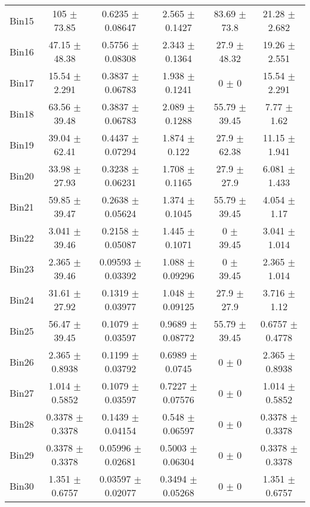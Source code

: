 \begin{tabular}{@{\extracolsep{4pt}}lccccc@{}}
     Bin15 & 105 $\pm$ 73.85 & 0.6235 $\pm$ 0.08647 & 2.565 $\pm$ 0.1427 & 83.69 $\pm$ 73.8 & 21.28 $\pm$ 2.682 \\ 
     Bin16 & 47.15 $\pm$ 48.38 & 0.5756 $\pm$ 0.08308 & 2.343 $\pm$ 0.1364 & 27.9 $\pm$ 48.32 & 19.26 $\pm$ 2.551 \\ 
     Bin17 & 15.54 $\pm$ 2.291 & 0.3837 $\pm$ 0.06783 & 1.938 $\pm$ 0.1241 & 0 $\pm$ 0 & 15.54 $\pm$ 2.291 \\ 
     Bin18 & 63.56 $\pm$ 39.48 & 0.3837 $\pm$ 0.06783 & 2.089 $\pm$ 0.1288 & 55.79 $\pm$ 39.45 & 7.77 $\pm$ 1.62 \\ 
     Bin19 & 39.04 $\pm$ 62.41 & 0.4437 $\pm$ 0.07294 & 1.874 $\pm$ 0.122 & 27.9 $\pm$ 62.38 & 11.15 $\pm$ 1.941 \\ 
     Bin20 & 33.98 $\pm$ 27.93 & 0.3238 $\pm$ 0.06231 & 1.708 $\pm$ 0.1165 & 27.9 $\pm$ 27.9 & 6.081 $\pm$ 1.433 \\ 
     Bin21 & 59.85 $\pm$ 39.47 & 0.2638 $\pm$ 0.05624 & 1.374 $\pm$ 0.1045 & 55.79 $\pm$ 39.45 & 4.054 $\pm$ 1.17 \\ 
     Bin22 & 3.041 $\pm$ 39.46 & 0.2158 $\pm$ 0.05087 & 1.445 $\pm$ 0.1071 & 0 $\pm$ 39.45 & 3.041 $\pm$ 1.014 \\ 
     Bin23 & 2.365 $\pm$ 39.46 & 0.09593 $\pm$ 0.03392 & 1.088 $\pm$ 0.09296 & 0 $\pm$ 39.45 & 2.365 $\pm$ 1.014 \\ 
     Bin24 & 31.61 $\pm$ 27.92 & 0.1319 $\pm$ 0.03977 & 1.048 $\pm$ 0.09125 & 27.9 $\pm$ 27.9 & 3.716 $\pm$ 1.12 \\ 
     Bin25 & 56.47 $\pm$ 39.45 & 0.1079 $\pm$ 0.03597 & 0.9689 $\pm$ 0.08772 & 55.79 $\pm$ 39.45 & 0.6757 $\pm$ 0.4778 \\ 
     Bin26 & 2.365 $\pm$ 0.8938 & 0.1199 $\pm$ 0.03792 & 0.6989 $\pm$ 0.0745 & 0 $\pm$ 0 & 2.365 $\pm$ 0.8938 \\ 
     Bin27 & 1.014 $\pm$ 0.5852 & 0.1079 $\pm$ 0.03597 & 0.7227 $\pm$ 0.07576 & 0 $\pm$ 0 & 1.014 $\pm$ 0.5852 \\ 
     Bin28 & 0.3378 $\pm$ 0.3378 & 0.1439 $\pm$ 0.04154 & 0.548 $\pm$ 0.06597 & 0 $\pm$ 0 & 0.3378 $\pm$ 0.3378 \\ 
     Bin29 & 0.3378 $\pm$ 0.3378 & 0.05996 $\pm$ 0.02681 & 0.5003 $\pm$ 0.06304 & 0 $\pm$ 0 & 0.3378 $\pm$ 0.3378 \\ 
     Bin30 & 1.351 $\pm$ 0.6757 & 0.03597 $\pm$ 0.02077 & 0.3494 $\pm$ 0.05268 & 0 $\pm$ 0 & 1.351 $\pm$ 0.6757 \\ 
\hline\hline
  \end{tabular}
